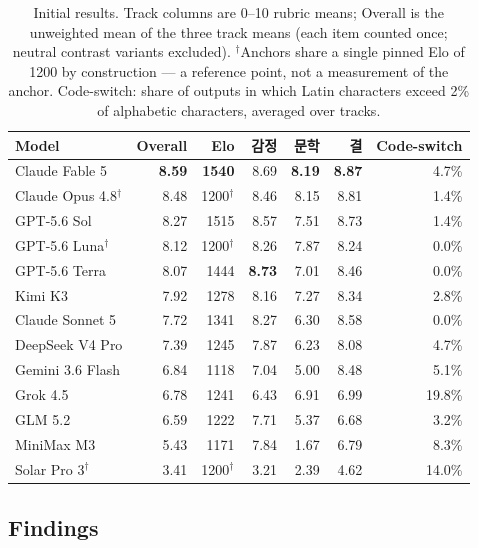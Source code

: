 \documentclass[11pt]{article}
\newcommand{\ko}[1]{#1}
\begin{document}
\begin{table}[t]
\centering
\small
\begin{tabular}{@{}lrrrrrr@{}}
\toprule
Model & Overall & Elo & \ko{감정} & \ko{문학} & \ko{결} & Code-switch \\
\midrule
Claude Fable 5          & \textbf{8.59} & \textbf{1540} & 8.69 & \textbf{8.19} & \textbf{8.87} & 4.7\% \\
Claude Opus 4.8$^\dagger$ & 8.48 & 1200$^\dagger$ & 8.46 & 8.15 & 8.81 & 1.4\% \\
GPT-5.6 Sol             & 8.27 & 1515 & 8.57 & 7.51 & 8.73 & 1.4\% \\
GPT-5.6 Luna$^\dagger$  & 8.12 & 1200$^\dagger$ & 8.26 & 7.87 & 8.24 & 0.0\% \\
GPT-5.6 Terra           & 8.07 & 1444 & \textbf{8.73} & 7.01 & 8.46 & 0.0\% \\
Kimi K3                 & 7.92 & 1278 & 8.16 & 7.27 & 8.34 & 2.8\% \\
Claude Sonnet 5         & 7.72 & 1341 & 8.27 & 6.30 & 8.58 & 0.0\% \\
DeepSeek V4 Pro         & 7.39 & 1245 & 7.87 & 6.23 & 8.08 & 4.7\% \\
Gemini 3.6 Flash        & 6.84 & 1118 & 7.04 & 5.00 & 8.48 & 5.1\% \\
Grok 4.5                & 6.78 & 1241 & 6.43 & 6.91 & 6.99 & 19.8\% \\
GLM 5.2                 & 6.59 & 1222 & 7.71 & 5.37 & 6.68 & 3.2\% \\
MiniMax M3              & 5.43 & 1171 & 7.84 & 1.67 & 6.79 & 8.3\% \\
Solar Pro 3$^\dagger$   & 3.41 & 1200$^\dagger$ & 3.21 & 2.39 & 4.62 & 14.0\% \\
\bottomrule
\end{tabular}
\caption{Initial results. Track columns are 0--10 rubric means; Overall
is the unweighted mean of the three track means (each item counted once;
neutral contrast variants excluded). $^\dagger$Anchors share a single
pinned Elo of 1200 by construction --- a reference point, not a
measurement of the anchor. Code-switch: share of outputs in which Latin
characters exceed 2\% of alphabetic characters, averaged over tracks.}
\label{tab:main}
\end{table}

\subsection{Findings}
\end{document}
